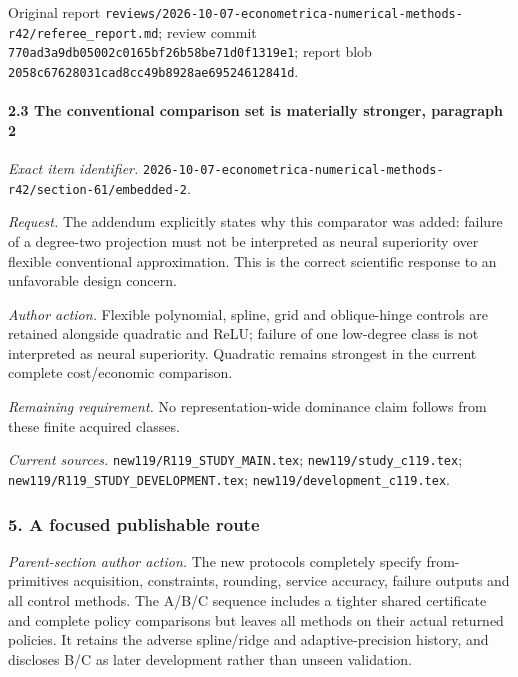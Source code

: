 Original report \nolinkurl{reviews/2026-10-07-econometrica-numerical-methods-r42/referee_report.md}; review commit \nolinkurl{770ad3a9db05002c0165bf26b58be71d0f1319e1}; report blob \nolinkurl{2058c67628031cad8cc49b8928ae69524612841d}.

\paragraph{2.3 The conventional comparison set is materially stronger, paragraph 2}

\emph{Exact item identifier.} \nolinkurl{2026-10-07-econometrica-numerical-methods-r42/section-61/embedded-2}.

\par\emph{Request.} The addendum explicitly states why this comparator was added: failure of a degree-two projection must not be interpreted as neural superiority over flexible conventional approximation. This is the correct scientific response to an unfavorable design concern.

\par\emph{Author action.} Flexible polynomial, spline, grid and oblique-hinge controls are retained alongside quadratic and ReLU; failure of one low-degree class is not interpreted as neural superiority. Quadratic remains strongest in the current complete cost/\allowbreak{}economic comparison.

\par\emph{Remaining requirement.} No representation-wide dominance claim follows from these finite acquired classes.

\par\emph{Current sources.} \nolinkurl{new119/R119_STUDY_MAIN.tex}; \nolinkurl{new119/study_c119.tex}; \nolinkurl{new119/R119_STUDY_DEVELOPMENT.tex}; \nolinkurl{new119/development_c119.tex}.

\subsubsection{5. A focused publishable route}

\emph{Parent-section author action.} The new protocols completely specify from-primitives acquisition, constraints, rounding, service accuracy, failure outputs and all control methods. The A/\allowbreak{}B/\allowbreak{}C sequence includes a tighter shared certificate and complete policy comparisons but leaves all methods on their actual returned policies. It retains the adverse spline/\allowbreak{}ridge and adaptive-precision history, and discloses B/\allowbreak{}C as later development rather than unseen validation.

